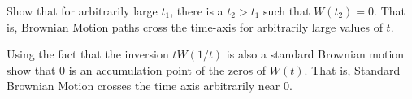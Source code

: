 \begin{problem}
 Show that for arbitrarily large $t_1$, there is a $t_2>t_1$ 
  such that $W(t_2)=0$. That is, Brownian Motion paths cross the time-axis for 
  arbitrarily large values of $t$.
\end{problem} 
\begin{solution} 

\end{solution}

\begin{problem}
 Using the fact that the inversion $t W(1/t)$ is also a standard 
  Brownian motion show that $0$ is an accumulation  point of the zeros of $W(t)$.  
  That is, Standard Brownian Motion crosses the time axis arbitrarily near $0$.
\end{problem} 
\begin{solution} 

\end{solution}


